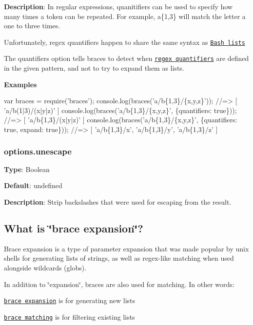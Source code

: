 {\bfseries Description}\+: In regular expressions, quanitifiers can be used to specify how many times a token can be repeated. For example, {\ttfamily a\{1,3\}} will match the letter {\ttfamily a} one to three times.

Unfortunately, regex quantifiers happen to share the same syntax as \href{#lists}{\tt Bash lists}

The {\ttfamily quantifiers} option tells braces to detect when \href{https://developer.mozilla.org/en-US/docs/Web/JavaScript/Reference/Global_Objects/RegExp#quantifiers}{\tt regex quantifiers} are defined in the given pattern, and not to try to expand them as lists.

{\bfseries Examples}


\begin{DoxyCode}
var braces = require('braces');
console.log(braces('a/b\{1,3\}/\{x,y,z\}'));
//=> [ 'a/b(1|3)/(x|y|z)' ]
console.log(braces('a/b\{1,3\}/\{x,y,z\}', \{quantifiers: true\}));
//=> [ 'a/b\{1,3\}/(x|y|z)' ]
console.log(braces('a/b\{1,3\}/\{x,y,z\}', \{quantifiers: true, expand: true\}));
//=> [ 'a/b\{1,3\}/x', 'a/b\{1,3\}/y', 'a/b\{1,3\}/z' ]
\end{DoxyCode}


\subsubsection*{options.\+unescape}

{\bfseries Type}\+: {\ttfamily Boolean}

{\bfseries Default}\+: {\ttfamily undefined}

{\bfseries Description}\+: Strip backslashes that were used for escaping from the result.

\subsection*{What is \char`\"{}brace expansion\char`\"{}?}

Brace expansion is a type of parameter expansion that was made popular by unix shells for generating lists of strings, as well as regex-\/like matching when used alongside wildcards (globs).

In addition to \char`\"{}expansion\char`\"{}, braces are also used for matching. In other words\+:


\begin{DoxyItemize}
\item \href{#brace-expansion}{\tt brace expansion} is for generating new lists
\item \href{#brace-matching}{\tt brace matching} is for filtering existing lists
\end{DoxyItemize}

